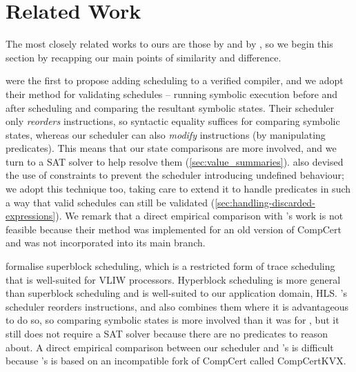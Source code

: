 {%

\section{Related Work}%
\label{sec:related-work}

The most closely related works to ours are those by \textcite{tristan08_formal_verif_trans_valid} and by \textcite{six22_formal_verif_super_sched}, so we begin this section by recapping our main points of similarity and difference.

\textcite{tristan08_formal_verif_trans_valid} were the first to propose adding scheduling to a verified compiler, and we adopt their method for validating schedules -- running symbolic execution before and after scheduling and comparing the resultant symbolic states. Their scheduler only \emph{reorders} instructions, so syntactic equality suffices for comparing symbolic states, whereas our scheduler can also \emph{modify} instructions (by manipulating predicates). This means that our state comparisons are more involved, and we turn to a SAT solver to help resolve them (\cref{sec:value_summaries}). \citeauthor{tristan08_formal_verif_trans_valid} also devised the use of constraints to prevent the scheduler introducing undefined behaviour; we adopt this technique too, taking care to extend it to handle predicates in such a way that valid schedules can still be validated (\cref{sec:handling-discarded-expressions}). We remark that a direct empirical comparison with \citeauthor{tristan08_formal_verif_trans_valid}'s work is not feasible because their method was implemented for an old version of CompCert and was not incorporated into its main branch.

\textcite{six22_formal_verif_super_sched} formalise superblock scheduling, which is a restricted form of trace scheduling that is well-suited for VLIW processors. Hyperblock scheduling is more general than superblock scheduling and is well-suited to our application domain, HLS. \citeauthor{six22_formal_verif_super_sched}'s scheduler reorders instructions, and also combines them where it is advantageous to do so, so comparing symbolic states is more involved than it was for \citeauthor{tristan08_formal_verif_trans_valid}, but it still does not require a SAT solver because there are no predicates to reason about. A direct empirical comparison between our scheduler and \citeauthor{six22_formal_verif_super_sched}'s is difficult because \citeauthor{six22_formal_verif_super_sched}'s is based on an incompatible fork of CompCert called CompCertKVX.

}
